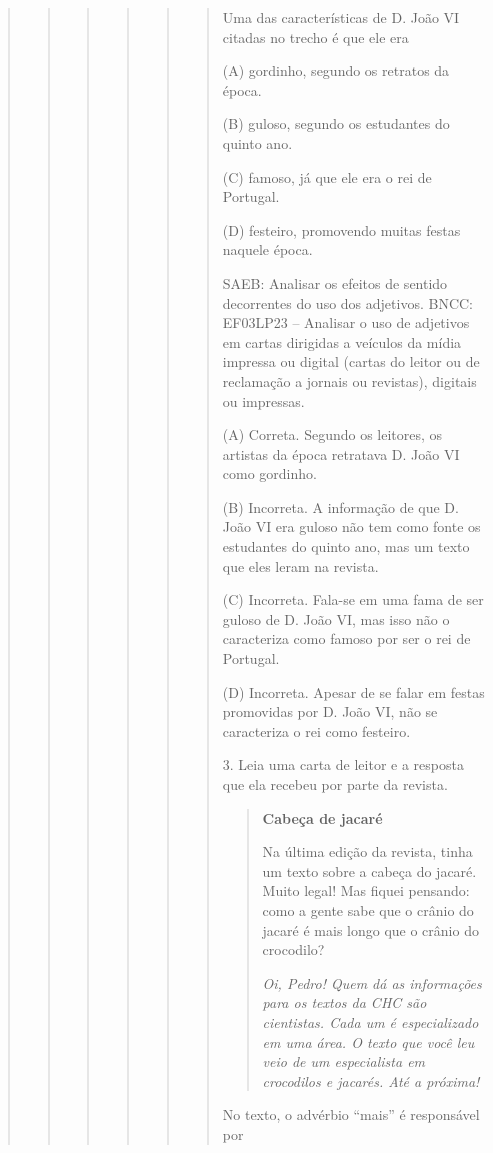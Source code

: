 \begin{boxlist}
{{\begin{quote}
\begin{quote}
\begin{quote}
{\begin{quote}
{\begin{quote}
\begin{quote}

Uma das características de D. João VI citadas no trecho é que ele era

(A) gordinho, segundo os retratos da época.

(B) guloso, segundo os estudantes do quinto ano.

(C) famoso, já que ele era o rei de Portugal.

(D) festeiro, promovendo muitas festas naquele época.

SAEB: Analisar os efeitos de sentido decorrentes do uso dos adjetivos.
BNCC: EF03LP23 -- Analisar o uso de adjetivos em cartas dirigidas a
veículos da mídia impressa ou digital (cartas do leitor ou de reclamação
a jornais ou revistas), digitais ou impressas.

(A) Correta. Segundo os leitores, os artistas da época retratava D. João VI como gordinho.

(B) Incorreta. A informação de que D. João VI era guloso não tem como fonte os estudantes do quinto ano, mas um texto que eles leram na revista.

(C) Incorreta. Fala-se em uma fama de ser guloso de D. João VI, mas isso não o caracteriza como famoso por ser o rei de Portugal.

(D) Incorreta. Apesar de se falar em festas promovidas por D. João VI, não se caracteriza o rei como festeiro.

3. Leia uma carta de leitor e a resposta que ela recebeu por parte da revista.

\begin{quote}
\textbf{Cabeça de jacaré}

Na última edição da revista, tinha um texto sobre a cabeça do jacaré.
Muito legal! Mas fiquei pensando: como a gente sabe que o crânio do jacaré
é mais longo que o crânio do crocodilo?

\textit{Oi, Pedro! Quem dá as informações para os textos da CHC são cientistas.
Cada um é especializado em uma área. O texto que você leu veio de um
especialista em crocodilos e jacarés. Até a próxima!}

\end{quote}

No texto, o advérbio ``mais'' é responsável por


\end{quote}
\end{quote}}
\end{quote}}
\end{quote}
\end{quote}
\end{quote}}}
\end{boxlist}
